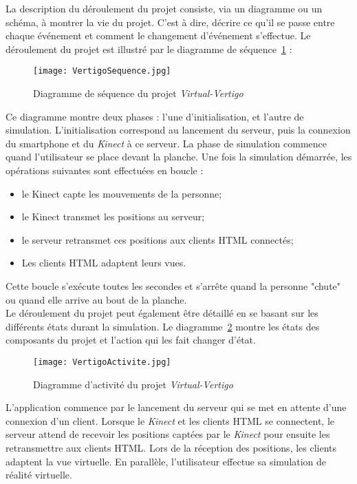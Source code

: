  
La description du déroulement du projet consiste, via un diagramme ou un schéma, à montrer la vie du projet. C'est à dire, décrire ce qu'il se passe entre chaque événement et comment le changement d'événement s'effectue. Le déroulement du projet est illustré par le diagramme de séquence~\ref{sequence} :
\begin{figure}[H]
	\centering
   		\texttt{[image: VertigoSequence.jpg]}
   	\caption{\label{sequence} Diagramme de séquence du projet \textit{Virtual-Vertigo}}
\end{figure}

Ce diagramme montre deux phases : l'une d'initialisation, et l'autre de simulation. L'initialisation correspond au lancement du serveur, puis la connexion du \textsf{smartphone} et du \textit{Kinect} à ce serveur. La phase de simulation commence quand l'utilisateur se place devant la planche. Une fois la simulation démarrée, les opérations suivantes sont effectuées en boucle : 

\begin{itemize}
\item le Kinect capte les mouvements de la personne;
\item le Kinect transmet les positions au serveur;
\item le serveur retransmet ces positions aux clients HTML connectés;
\item Les clients HTML adaptent leurs vues.\\

\end{itemize}
Cette boucle s'exécute toutes les secondes et s'arrête quand la personne "chute" ou quand elle arrive au bout de la planche.\\

Le déroulement du projet peut également être détaillé en se basant sur les différents états durant la simulation. Le diagramme~\ref{activiteDiag} montre les états des composants du projet et l'action qui les fait changer d'état.
\begin{figure}[H]
	\centering
   		\texttt{[image: VertigoActivite.jpg]}
   	\caption{\label{activiteDiag} Diagramme d'activité du projet \textit{Virtual-Vertigo}}
\end{figure} 
L'application commence par le lancement du serveur qui se met en attente d'une connexion d'un client. Lorsque le \textit{Kinect} et les clients HTML se connectent, le serveur attend de recevoir les positions captées par le \textit{Kinect} pour ensuite les retransmettre aux clients HTML. Lors de la réception des positions, les clients adaptent la vue virtuelle. En parallèle, l'utilisateur effectue sa simulation de réalité virtuelle.




